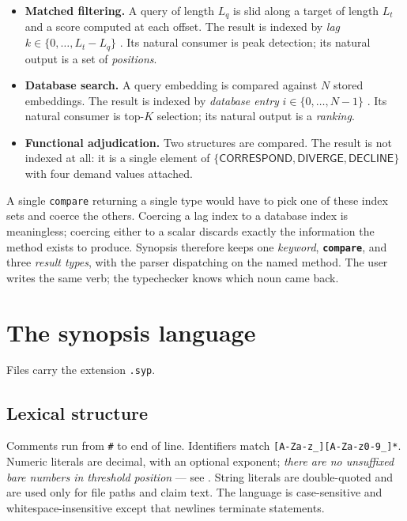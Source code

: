 \documentclass[11pt,twocolumn,a4paper]{article}
\theoremstyle{plain}
\theoremstyle{definition}
\theoremstyle{remark}
\newcommand{\kw}[1]{\texttt{\textbf{#1}}}
\begin{document}
\begin{itemize}[leftmargin=1.4em]
\item \textbf{Matched filtering.} A query of length $L_q$ is slid along a
      target of length $L_t$ and a score computed at each offset. The
      result is indexed by \emph{lag} $k\in\{0,\dots,L_t-L_q\}$
      \cite{turin1960introduction,oppenheim2009discrete}. Its natural
      consumer is peak detection; its natural output is a set of
      \emph{positions}.
\item \textbf{Database search.} A query embedding is compared against
      $N$ stored embeddings. The result is indexed by \emph{database
      entry} $i\in\{0,\dots,N-1\}$
      \cite{altschul1990basic,steinegger2017mmseqs2}. Its natural
      consumer is top-$K$ selection; its natural output is a
      \emph{ranking}.
\item \textbf{Functional adjudication.} Two structures are compared. The
      result is not indexed at all: it is a single element of
      $\{\textsf{CORRESPOND},\textsf{DIVERGE},\textsf{DECLINE}\}$ with
      four demand values attached.
\end{itemize}

A single \texttt{compare} returning a single type would have to pick one
of these index sets and coerce the others. Coercing a lag index to a
database index is meaningless; coercing either to a scalar discards
exactly the information the method exists to produce. Synopsis therefore
keeps one \emph{keyword}, \kw{compare}, and three \emph{result types},
with the parser dispatching on the named method. The user writes the
same verb; the typechecker knows which noun came back.

\section{The synopsis language}
\label{sec:lang}

Files carry the extension \texttt{.syp}.

\subsection{Lexical structure}

Comments run from \texttt{\#} to end of line. Identifiers match
\texttt{[A-Za-z\_][A-Za-z0-9\_]*}. Numeric literals are decimal, with an
optional exponent; \emph{there are no unsuffixed bare numbers in
threshold position} --- see . String literals are
double-quoted and are used only for file paths and claim text. The
language is case-sensitive and whitespace-insensitive except that
newlines terminate statements.
\end{document}
